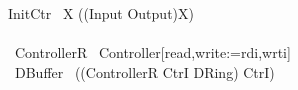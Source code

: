 \documentclass[10pt]{article}
\begin{document}
\begin{circus}
 \circspot InitCtr \circseq\ \circmu X \circspot ((Input \extchoice Output)\circseq X)
\\
\circend
\\
\circprocess\ ControllerR \circdef\ Controller[read,write:=rdi,wrti]
\\
\circprocess\ DBuffer \circdef\ ((ControllerR \lpar CtrI \rpar DRing) \circhide CtrI)
\end{circus}%
\end{document}
